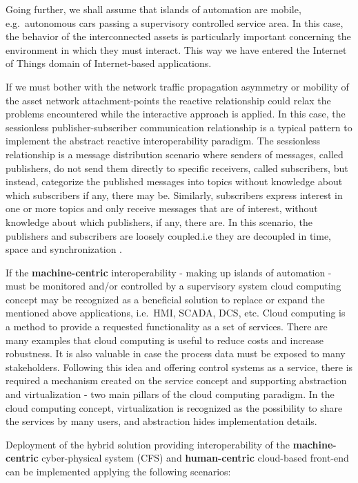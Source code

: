 \documentclass{jacsart}
\begin{document}
Going further, we shall assume that islands of automation are mobile, e.g.~autonomous cars passing a supervisory controlled service area. In this case, the behavior of the interconnected assets is particularly important concerning the environment in which they must interact. This way we have entered the Internet of Things domain of Internet-based applications.

If we must bother with the network traffic propagation asymmetry or mobility of the asset network attachment-points the reactive relationship could relax the problems encountered while the interactive approach is applied. In this case, the sessionless publisher-subscriber communication relationship is a typical pattern to implement the abstract reactive interoperability paradigm. The sessionless relationship is a message distribution scenario where senders of messages, called publishers, do not send them directly to specific receivers, called subscribers, but instead, categorize the published messages into topics without knowledge about which subscribers if any, there may be. Similarly, subscribers express interest in one or more topics and only receive messages that are of interest, without knowledge about which publishers, if any, there are. In this scenario, the publishers and subscribers are loosely coupled.i.e they are decoupled in time, space and synchronization \cite{RefWorks:doc:5c44e246e4b0591b15ea9e59}.

If the \textbf{machine-centric} interoperability - making up islands of automation - must be monitored and/or controlled by a supervisory system cloud computing concept may be recognized as a beneficial solution to replace or expand the mentioned above applications, i.e.~HMI, SCADA, DCS, etc. Cloud computing is a method to provide a requested functionality as a set of services. There are many examples that cloud computing is useful to reduce costs and increase robustness. It is also valuable in case the process data must be exposed to many stakeholders. Following this idea and offering control systems as a service, there is required a mechanism created on the service concept and supporting abstraction and virtualization - two main pillars of the cloud computing paradigm. In the cloud computing concept, virtualization is recognized as the possibility to share the services by many users, and abstraction hides implementation details.

Deployment of the hybrid solution providing interoperability of the \textbf{machine-centric} cyber-physical system (CFS) and \textbf{human-centric} cloud-based front-end can be implemented applying the following scenarios:
\end{document}
